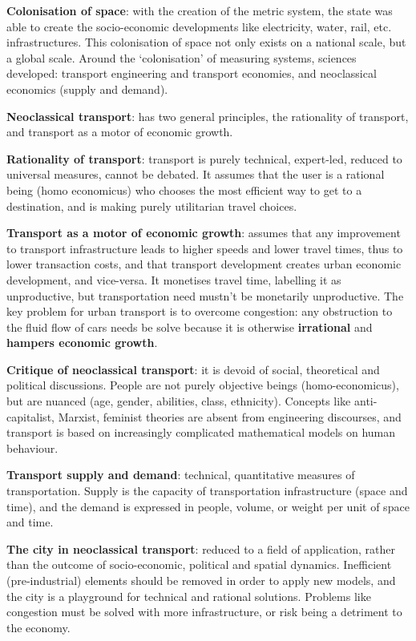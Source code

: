 \documentclass{article}
\newcommand{\alignedmarginpar}[1]{%
        \marginpar{\raggedright\small#1}}
\begin{document}
\textbf{Colonisation of space}: with the creation of the metric system, the state was able to create the socio-economic developments like electricity, water, rail, etc. infrastructures. This colonisation of space not only exists on a national scale, but a global scale. Around the `colonisation' of measuring systems, sciences developed: transport engineering and transport economies, and neoclassical economics (supply and demand).

\textbf{Neoclassical transport}: has two general principles, the rationality of transport, and transport as a motor of economic growth.

\textbf{Rationality of transport}: transport is purely technical, expert-led, reduced to universal measures, cannot be debated. It assumes that the user is a rational being (homo economicus) who chooses the most efficient way to get to a destination, and is making purely utilitarian travel choices.

\textbf{Transport as a motor of economic growth}: assumes that any improvement to transport infrastructure leads to higher speeds and lower travel times, thus to lower transaction costs, and that transport development creates urban economic development, and vice-versa. It monetises travel time, labelling it as unproductive, but transportation need mustn't be monetarily unproductive.\alignedmarginpar{Cycling for leisure}The key problem for urban transport is to overcome congestion: any obstruction to the fluid flow of cars needs be solve because it is otherwise \textbf{irrational} and \textbf{hampers economic growth}.

\textbf{Critique of neoclassical transport}: it is devoid of social, theoretical and political discussions. People are not purely objective beings (homo-economicus), but are nuanced (age, gender, abilities, class, ethnicity). Concepts like anti-capitalist, Marxist, feminist theories are absent from engineering discourses, and transport is based on increasingly complicated mathematical models on human behaviour.

\textbf{Transport supply and demand}: technical, quantitative measures of transportation. Supply is the capacity of transportation infrastructure (space and time), and the demand is expressed in people, volume, or weight per unit of space and time.

\textbf{The city in neoclassical transport}: reduced to a field of application, rather than the outcome of socio-economic, political and spatial dynamics. Inefficient (pre-industrial) elements should be removed in order to apply new models, and the city is a playground for technical and rational solutions. Problems like congestion must be solved with more infrastructure, or risk being a detriment to the economy.
\end{document}
